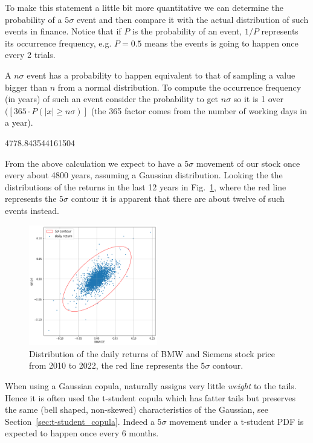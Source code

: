 To make this statement a little bit more quantitative we can determine the probability of a $5\sigma$ event and then compare it with the actual distribution of such events in finance. Notice that if $P$ is the probability of an event, $1/P$ represents its occurrence frequency, e.g. $P=0.5$ means the events is going to happen once every 2 trials.

\begin{attention}
A $n\sigma$ event has a probability to happen equivalent to that of sampling a value bigger than $n$ from a normal distribution.
To compute the occurrence frequency (in years) of such an event consider the probability to get $n\sigma$ so it is 1 over $(
[365\cdot P(|x| \ge n\sigma)]$ (the 365 factor comes from the number of working days in a year).

\begin{ioutput}
4778.843544161504
\end{ioutput}
\noindent
\end{attention}

From the above calculation we expect to have a $5\sigma$ movement of our stock once every about 4800 years, assuming a Gaussian distribution. Looking the the distributions of the returns in the last 12 years in Fig.~\ref{fig:5sigma_contour}, where the red line represents the $5\sigma$ contour it is apparent that there are about twelve of such events instead.

\begin{figure}[htbp]
\centering
\includegraphics[width=0.5\textwidth]{figures/5_sigma_contour}
\caption{Distribution of the daily returns of BMW and Siemens stock price from 2010 to 2022, the red line represents the $5\sigma$ contour.}
\label{fig:5sigma_contour}
\end{figure}

When using a Gaussian copula, naturally assigns very little \emph{weight} to the tails. Hence it is often used the t-student copula which has fatter tails but preserves the same (bell shaped, non-skewed) characteristics of the Gaussian, see Section~\ref{sec:t-student_copula}. Indeed a $5\sigma$ movement under a t-student PDF is expected to happen once every 6 months. 

